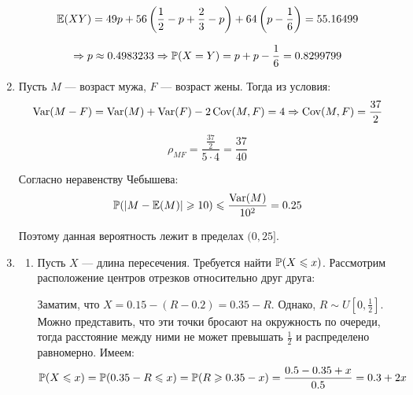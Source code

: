 \documentclass[12pt, a4paper]{article}\usepackage[]{graphicx}\usepackage[]{color}
\begin{document}
\begin{enumerate}
\[
\E(XY) = 49p+56\left(\frac{1}{2} - p + \frac{2}{3}-p\right) + 64\left(p-\frac{1}{6}\right) = 55.16499
\]

\[
\Rightarrow p \approx 0.4983233 \Rightarrow \P(X=Y) = p + p-\frac{1}{6} = 0.8299799
\]



\item

Пусть $M$ — возраст мужа, $F$ — возраст жены. Тогда из условия:
\[
\Var(M-F) = \Var(M) + \Var(F) - 2\Cov(M, F) = 4 \Rightarrow \Cov(M, F) = \frac{37}{2}
\]

\[
\rho_{MF} = \frac{\frac{37}{2}}{5\cdot4} = \frac{37}{40}
\]


Согласно неравенству Чебышева:
\[
\P(|M-\E(M)|\geqslant10) \leqslant\frac{\Var(M)}{10^2} = 0.25
\]

Поэтому данная вероятность лежит в пределах $(0, 25]$.

\renewcommand{\labelenumii}{(\alph{enumii})}
\item
\begin{enumerate}
\item Пусть $X$ — длина пересечения. Требуется найти $\P(X\leqslant x)$. Рассмотрим расположение центров отрезков относительно друг друга:

\begin{center}
\end{center}

Заматим, что $X = 0.15-(R-0.2) = 0.35-R$. Однако, $R \sim U\left[0, \frac{1}{2}\right]$. Можно представить, что эти точки бросают на окружность по очереди, тогда расстояние между ними не может превышать $\frac{1}{2}$ и распределено равномерно. Имеем:
\[
\P(X \leqslant x) = \P(0.35-R\leqslant x) = \P(R \geqslant 0.35-x) = \frac{0.5-0.35+x}{0.5} = 0.3+2x
\]


\end{enumerate}
\end{enumerate}
\end{document}
